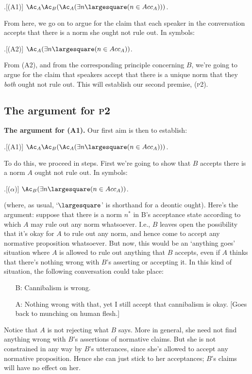 \documentclass[11pt,article,oneside]{memoir}
\newcommand{\ought}{\largesquare}
\begin{document}
\ex.[(A1)] $\Ac_A \Ac_B (\Ac_A (\exists n \ought (n \in {Acc}_A)))$.

From here, we go on to argue for the claim that each speaker in the conversation accepts that there is a norm she ought not rule out. In symbols:

\ex.[(A2)] $\Ac_A (\exists n \ought (n \in {Acc}_A))$.

From (A2), and from the corresponding principle concerning $B$, we're going to argue for the claim that speakers accept that there is a unique norm that they \emph{both} ought not rule out. This will establish our second premise, (\textsc{p2}). 


\subsection{The argument for \textsc{p2}}
\textbf{The argument for (A1).} Our first aim is then to establish:

\ex.[(A1)] $\Ac_A \Ac_B (\Ac_A (\exists n \ought (n \in {Acc}_A)))$.

To do this, we proceed in steps. First we're going to show that $B$ accepts there is a norm $A$ ought not rule out. In symbols:

\ex.[($\alpha$)] $\Ac_B (\exists n \ought (n \in {Acc}_A))$.

(where, as usual, `$\ought$' is shorthand for a deontic ought). Here's the argument: suppose that there is a norm $n^*$ in B's acceptance state according to which $A$ may rule out any norm whatsoever. I.e., $B$ leaves open the possibility that it's okay for $A$ to rule out any norm, and hence come to accept any normative proposition whatsoever. But now, this would be an `anything goes' situation where $A$ is allowed to rule out anything that $B$ accepts, even if $A$ thinks that there's nothing wrong with $B$'s asserting or accepting it. In this kind of situation, the following conversation could take place:
\begin{itemize}
\item[B:] Cannibalism is wrong.
\item[A:] Nothing wrong with that, yet I still accept that cannibalism is okay. [Goes back to munching on human flesh.]
\end{itemize}
Notice that $A$ is not rejecting what $B$ says. More in general, she need not find anything wrong with $B$'s assertions of normative claims. But she is not constrained in any way by $B$'s utterances, since she's allowed to accept any normative proposition. Hence she can just stick to her acceptances; $B$'s claims will have no effect on her. 
\end{document}
